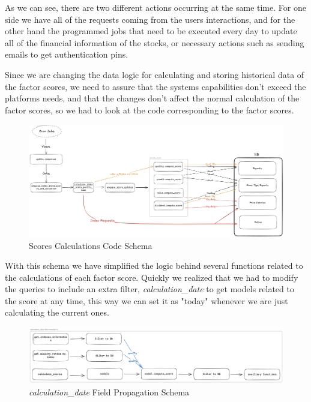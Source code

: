 \documentclass[11pt,english,a4paper,hidelinks]{book}
\begin{document}
\noindent As we can see, there are two different actions occurring at the same time. For one side we have all of the requests coming from the users interactions, and for the other hand the programmed jobs that need to be executed every day to update all of the financial information of the stocks, or necessary actions such as sending emails to get authentication pins.

\vspace{0.5cm}
\noindent Since we are changing the data logic for calculating and storing historical data of the factor scores, we need to assure that the systems capabilities don't exceed the platforms needs, and that the changes don't affect the normal calculation of the factor scores, so we had to look at the code corresponding to the factor scores.

\begin{figure}[H]
    \centering
    \includegraphics[width=1\textwidth]{images/tweenvest/scores schema.png}
    \caption{Scores Calculations Code Schema}
    \label{fig:scores_schema}
\end{figure}

\noindent With this schema we have simplified the logic behind several functions related to the calculations of each factor score. Quickly we realized that we had to modify the queries to include an extra filter, \textit{calculation\_date} to get models related to the score at any time, this way we can set it as "today" whenever we are just calculating the current ones.


\begin{figure}[H]
    \centering
    \includegraphics[width=1\textwidth]{images/tweenvest/Propagation Schema.png}
    \caption{\textit{calculation\_date} Field Propagation Schema}
    \label{fig:propagation_schema}
\end{figure}
\end{document}
